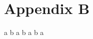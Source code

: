 \chapter{Appendix B}\label{chap:introduction}

a
\newpage
b
\newpage
a
\newpage
b
\newpage
a
\newpage
b
\newpage
a
\newpage

\newpage
